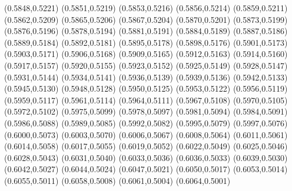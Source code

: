 \PST@Filltriangle(0.5848,0.5221)
\PST@Filltriangle(0.5851,0.5219)
\PST@Filltriangle(0.5853,0.5216)
\PST@Filltriangle(0.5856,0.5214)
\PST@Filltriangle(0.5859,0.5211)
\PST@Filltriangle(0.5862,0.5209)
\PST@Filltriangle(0.5865,0.5206)
\PST@Filltriangle(0.5867,0.5204)
\PST@Filltriangle(0.5870,0.5201)
\PST@Filltriangle(0.5873,0.5199)
\PST@Filltriangle(0.5876,0.5196)
\PST@Filltriangle(0.5878,0.5194)
\PST@Filltriangle(0.5881,0.5191)
\PST@Filltriangle(0.5884,0.5189)
\PST@Filltriangle(0.5887,0.5186)
\PST@Filltriangle(0.5889,0.5184)
\PST@Filltriangle(0.5892,0.5181)
\PST@Filltriangle(0.5895,0.5178)
\PST@Filltriangle(0.5898,0.5176)
\PST@Filltriangle(0.5901,0.5173)
\PST@Filltriangle(0.5903,0.5171)
\PST@Filltriangle(0.5906,0.5168)
\PST@Filltriangle(0.5909,0.5165)
\PST@Filltriangle(0.5912,0.5163)
\PST@Filltriangle(0.5914,0.5160)
\PST@Filltriangle(0.5917,0.5157)
\PST@Filltriangle(0.5920,0.5155)
\PST@Filltriangle(0.5923,0.5152)
\PST@Filltriangle(0.5925,0.5149)
\PST@Filltriangle(0.5928,0.5147)
\PST@Filltriangle(0.5931,0.5144)
\PST@Filltriangle(0.5934,0.5141)
\PST@Filltriangle(0.5936,0.5139)
\PST@Filltriangle(0.5939,0.5136)
\PST@Filltriangle(0.5942,0.5133)
\PST@Filltriangle(0.5945,0.5130)
\PST@Filltriangle(0.5948,0.5128)
\PST@Filltriangle(0.5950,0.5125)
\PST@Filltriangle(0.5953,0.5122)
\PST@Filltriangle(0.5956,0.5119)
\PST@Filltriangle(0.5959,0.5117)
\PST@Filltriangle(0.5961,0.5114)
\PST@Filltriangle(0.5964,0.5111)
\PST@Filltriangle(0.5967,0.5108)
\PST@Filltriangle(0.5970,0.5105)
\PST@Filltriangle(0.5972,0.5102)
\PST@Filltriangle(0.5975,0.5099)
\PST@Filltriangle(0.5978,0.5097)
\PST@Filltriangle(0.5981,0.5094)
\PST@Filltriangle(0.5984,0.5091)
\PST@Filltriangle(0.5986,0.5088)
\PST@Filltriangle(0.5989,0.5085)
\PST@Filltriangle(0.5992,0.5082)
\PST@Filltriangle(0.5995,0.5079)
\PST@Filltriangle(0.5997,0.5076)
\PST@Filltriangle(0.6000,0.5073)
\PST@Filltriangle(0.6003,0.5070)
\PST@Filltriangle(0.6006,0.5067)
\PST@Filltriangle(0.6008,0.5064)
\PST@Filltriangle(0.6011,0.5061)
\PST@Filltriangle(0.6014,0.5058)
\PST@Filltriangle(0.6017,0.5055)
\PST@Filltriangle(0.6019,0.5052)
\PST@Filltriangle(0.6022,0.5049)
\PST@Filltriangle(0.6025,0.5046)
\PST@Filltriangle(0.6028,0.5043)
\PST@Filltriangle(0.6031,0.5040)
\PST@Filltriangle(0.6033,0.5036)
\PST@Filltriangle(0.6036,0.5033)
\PST@Filltriangle(0.6039,0.5030)
\PST@Filltriangle(0.6042,0.5027)
\PST@Filltriangle(0.6044,0.5024)
\PST@Filltriangle(0.6047,0.5021)
\PST@Filltriangle(0.6050,0.5017)
\PST@Filltriangle(0.6053,0.5014)
\PST@Filltriangle(0.6055,0.5011)
\PST@Filltriangle(0.6058,0.5008)
\PST@Filltriangle(0.6061,0.5004)
\PST@Filltriangle(0.6064,0.5001)
